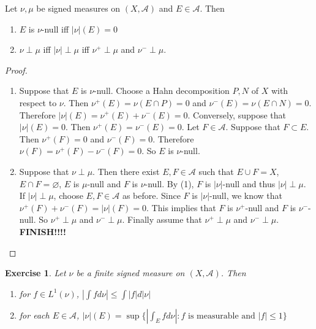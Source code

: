 \documentclass[12pt]{amsart}
\newtheorem{ex}[thm]{Exercise}
\newcommand{\MA}{\mathcal{A}}
\begin{document}
Let $\nu, \mu$ be signed measures on $(X,\MA)$ and $E \in \MA$. Then 
\begin{enumerate}
\item $E$ is $\nu$-null iff $|\nu|(E) = 0$
\item $\nu \perp \mu$ iff $|\nu| \perp \mu$ iff $\nu^+ \perp \mu$ and $\nu^- \perp \mu$.
\end{enumerate}

\begin{proof}
\begin{enumerate}
\item Suppose that $E$ is $\nu$-null. Choose a Hahn decomposition $P,N$ of $X$ with respect to $\nu$. Then $\nu^+(E) = \nu(E \cap P) = 0$ and $\nu^-(E) = \nu(E \cap N) = 0$. Therefore $|\nu|(E) = \nu^+(E) + \nu^-(E) = 0$. Conversely, suppose that $|\nu|(E) = 0$. Then $\nu^+(E) = \nu^-(E) = 0$. Let $F \in \MA$. Suppose that $F \subset E$. Then $\nu^+(F) = 0$ and $\nu^-(F) = 0$. Therefore $\nu(F) = \nu^+(F) - \nu^-(F) = 0$. So $E$ is $\nu$-null.

\item Suppose that $\nu \perp \mu$. Then there exist $E,F \in \MA$ such that $E \cup F = X$, $E \cap F = \varnothing$, $E$ is $\mu$-null and $F$ is $\nu$-null. By (1), $F$ is $|\nu|$-null and thus $|\nu| \perp \mu$. If $|\nu| \perp \mu$, choose $E,F \in \MA$ as before. Since $F$ is $|\nu|$-null, we know that $\nu^+(F) + \nu^-(F) = |\nu|(F) = 0$. This implies that $F$ is $\nu^+$-null and $F$ is $\nu^-$-null. So $\nu^+ \perp \mu$ and $\nu^- \perp \mu$. Finally assume that $\nu^+ \perp \mu$ and $\nu^- \perp \mu$. \textbf{FINISH!!!!}

\end{enumerate}
\end{proof}

\begin{ex}
Let $\nu$ be a finite signed measure on $(X, \MA)$. Then 
\begin{enumerate}
\item for $f \in L^1(\nu)$, $|\int f d \nu| \leq \int |f| d |\nu|$
\item for each $E \in \MA$, $|\nu|(E) = \sup \{|\int_E f d \nu |: f  \text{ is measurable and } |f| \leq 1 \}$
\end{enumerate}
\end{ex}
\end{document}
